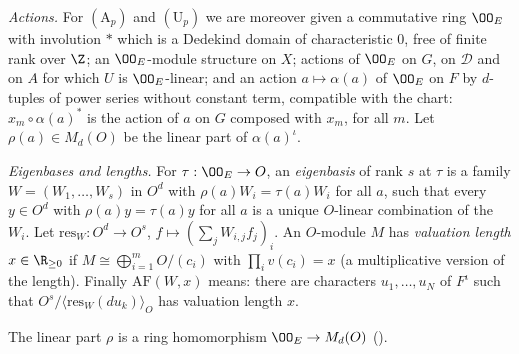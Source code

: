 \begin{definition}\label{pf:sh-local:def:eigen}
\emph{Actions.} For $(\mathrm A_p)$ and $(\mathrm U_p)$ we are moreover given a commutative ring $\OO_E$ with
involution $*$ which is a Dedekind domain of characteristic $0$, free of finite rank over $\Z$; an $\OO_E$-module
structure on $X$; actions of $\OO_E$ on $G$, on $\mathcal D$ and on $A$ for which $U$ is $\OO_E$-linear; and an action
$a\mapsto\alpha(a)$ of $\OO_E$ on $F$ by $d$-tuples of power series without constant term, compatible with the chart:
$x_m\circ\alpha(a)^*$ is the action of $a$ on $G$ composed with $x_m$, for all $m$. Let $\rho(a)\in M_d(O)$ be the
linear part of $\alpha(a)^\iota$.

\emph{Eigenbases and lengths.} For $\tau:\OO_E\to O$, an \emph{eigenbasis} of rank $s$ at $\tau$ is a family
$W=(W_1,\dots,W_s)$ in $O^d$ with $\rho(a)W_i=\tau(a)W_i$ for all $a$, such that every $y\in O^d$ with
$\rho(a)y=\tau(a)y$ for all $a$ is a unique $O$-linear combination of the $W_i$. Let
$\mathrm{res}_W:O^d\to O^s$, $f\mapsto(\sum_jW_{i,j}f_j)_i$. An $O$-module $M$ has \emph{valuation length}
$x\in\R_{\ge0}$ if $M\cong\bigoplus_{i=1}^mO/(c_i)$ with $\prod_iv(c_i)=x$ (a multiplicative version of the length).
Finally $\mathrm{AF}(W,x)$ means: there are characters $u_1,\dots,u_N$ of $F^\iota$ such that
$O^s/\langle\mathrm{res}_W(du_k)\rangle_O$ has valuation length $x$.
\end{definition}

The linear part $\rho$ is a ring homomorphism $\OO_E\to M_d(O)$
().

